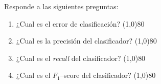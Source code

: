 \documentclass[11pt]{article}
\begin{document}
\begin{enumerate}
  Responde a las siguientes preguntas:
  \begin{enumerate}
  \item ¿Cual es el error de clasificación? \line(1,0){80}
  \item ¿Cual es la precisión del clasificador? \line(1,0){80}
  \item ¿Cual es el \emph{recall} del clasificador? \line(1,0){80}
  \item ¿Cual es el $F_1$--score del clasificador? \line(1,0){80}
  \end{enumerate}


\end{enumerate}
\end{document}
